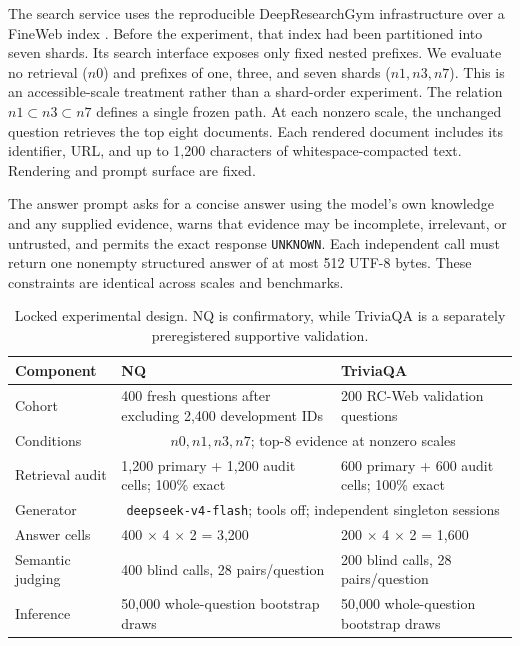 \documentclass[sigconf,nonacm]{acmart}
\newcommand{\nzero}{\ensuremath{n0}}
\newcommand{\none}{\ensuremath{n1}}
\newcommand{\nthree}{\ensuremath{n3}}
\newcommand{\nseven}{\ensuremath{n7}}
\begin{document}
The search service uses the reproducible DeepResearchGym infrastructure \cite{coelho2026deepresearchgym} over a FineWeb index \cite{penedo2024fineweb}. Before the experiment, that index had been partitioned into seven shards. Its search interface exposes only fixed nested prefixes. We evaluate no retrieval ($\nzero$) and prefixes of one, three, and seven shards ($\none,\nthree,\nseven$). This is an accessible-scale treatment rather than a shard-order experiment. The relation $\none\subset\nthree\subset\nseven$ defines a single frozen path. At each nonzero scale, the unchanged question retrieves the top eight documents. Each rendered document includes its identifier, URL, and up to 1,200 characters of whitespace-compacted text. Rendering and prompt surface are fixed.

The answer prompt asks for a concise answer using the model's own knowledge and any supplied evidence, warns that evidence may be incomplete, irrelevant, or untrusted, and permits the exact response \texttt{UNKNOWN}.  Each independent call must return one nonempty structured answer of at most 512 UTF-8 bytes. These constraints are identical across scales and benchmarks.

\begin{table}[t]
  \caption{Locked experimental design. NQ is confirmatory, while TriviaQA is a separately preregistered supportive validation.}
  \label{tab:design}
  \small
  \begin{tabularx}{\textwidth}{lXX}
    \toprule
    \rowcolor{auditheader}
    \textcolor{auditnavy}{\textbf{Component}} & \textcolor{auditnavy}{\textbf{NQ}} & \textcolor{auditnavy}{\textbf{TriviaQA}} \\
    \midrule
    Cohort & 400 fresh questions after excluding 2,400 development IDs &
    200 RC-Web validation questions \\
    \rowcolor{auditstripe}
    Conditions & \multicolumn{2}{c}{$\nzero,\none,\nthree,\nseven$; top-8 evidence at nonzero scales} \\
    Retrieval audit & 1,200 primary + 1,200 audit cells; 100\% exact &
    600 primary + 600 audit cells; 100\% exact \\
    \rowcolor{auditstripe}
    Generator & \multicolumn{2}{c}{\texttt{deepseek-v4-flash}; tools off; independent singleton sessions} \\
    Answer cells & 400 $\times$ 4 $\times$ 2 = 3,200 &
    200 $\times$ 4 $\times$ 2 = 1,600 \\
    \rowcolor{auditstripe}
    Semantic judging & 400 blind calls, 28 pairs/question &
    200 blind calls, 28 pairs/question \\
    Inference & 50,000 whole-question bootstrap draws &
    50,000 whole-question bootstrap draws \\
    \bottomrule
  \end{tabularx}
\end{table}
\end{document}
